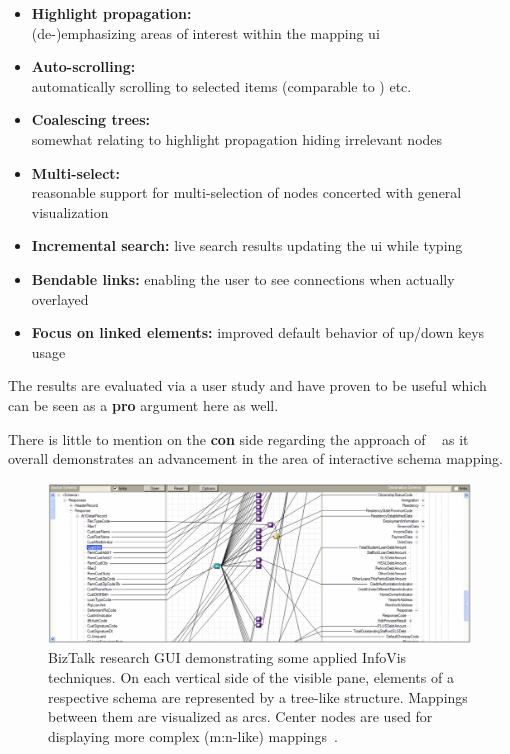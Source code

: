 \begin{itemize}
  \item \textbf{Highlight propagation:} \\(de-)emphasizing areas of interest within the mapping \gls{ui}
  \item \textbf{Auto-scrolling:} \\automatically scrolling to selected items (comparable to ) etc.
  \item \textbf{Coalescing trees:} \\somewhat relating to highlight propagation hiding irrelevant nodes
  \item \textbf{Multi-select:} \\reasonable support for multi-selection of nodes concerted with general visualization
  \item \textbf{Incremental search:} live search results updating the \gls{ui} while typing
  \item \textbf{Bendable links:} enabling the user to see connections when actually overlayed
  \item \textbf{Focus on linked elements:} improved default behavior of up/down keys usage
\end{itemize}

The results are evaluated via a user study and have proven to be useful which can be seen as a \textbf{pro} argument here as well.

There is little to mention on the \textbf{con} side regarding the approach of ~\cite{Robertson2005} as it overall demonstrates an advancement in the area of interactive schema mapping.

\begin{figure}[h]
  \centering
  \includegraphics[width=1.0\textwidth]{figures/state-of-the-art/biztalk-research}
  \caption{BizTalk research GUI demonstrating some applied InfoVis techniques. On each vertical side of the visible pane, elements of a respective schema are represented by a tree-like structure. Mappings between them are visualized as arcs. Center nodes are used for displaying more complex (m:n-like) mappings~\cite{Robertson2005}.}
  \label{fig:biztalk-research-screenshot}
\end{figure}


